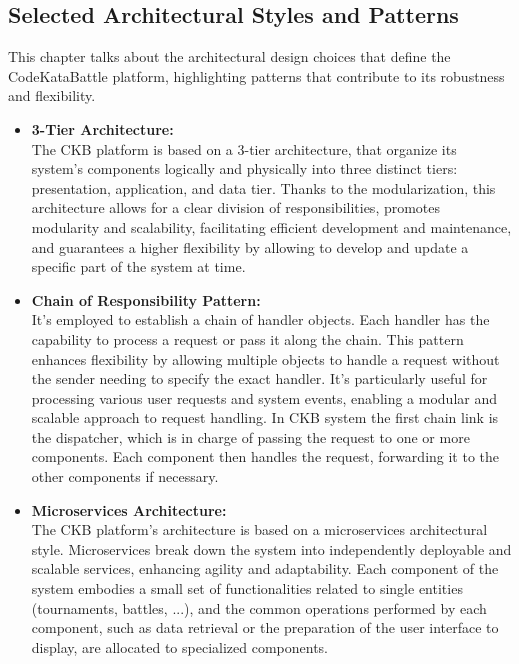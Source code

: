 \begin{itemize}
\begin{itemize}
    \end{itemize}
    
 \end{itemize}

 \subsection{Selected Architectural Styles and Patterns}
 This chapter talks about the architectural design choices that define the CodeKataBattle platform, highlighting patterns that contribute to its robustness and flexibility.
 
\begin{itemize}
    \item \textbf{3-Tier Architecture:} \\
    The CKB platform is based on a 3-tier architecture, that organize its system’s components logically and physically into three distinct tiers: presentation, application, and data tier. Thanks to the modularization, this architecture allows for a clear division of responsibilities, promotes modularity and scalability, facilitating efficient development and maintenance, and guarantees a higher flexibility by allowing to develop and update a specific part of the system at time. 
    
    \item \textbf{Chain of Responsibility Pattern:} \\
    It's employed to establish a chain of handler objects. Each handler has the capability to process a request or pass it along the chain. This pattern enhances flexibility by allowing multiple objects to handle a request without the sender needing to specify the exact handler. It’s particularly useful for processing various user requests and system events, enabling a modular and scalable approach to request handling. In CKB system the first chain link is the dispatcher, which is in charge of passing the request to one or more components. Each component then handles the request, forwarding it to the other components if necessary.

    \item \textbf{Microservices Architecture:} \\
    The CKB platform's architecture is based on a microservices architectural style. Microservices break down the system into independently deployable and scalable services, enhancing agility and adaptability. Each component of the system embodies a small set of functionalities related to single entities (tournaments, battles, ...), and the common operations performed by each component, such as data retrieval or the preparation of the user interface to display, are allocated to specialized components.


\end{itemize}
